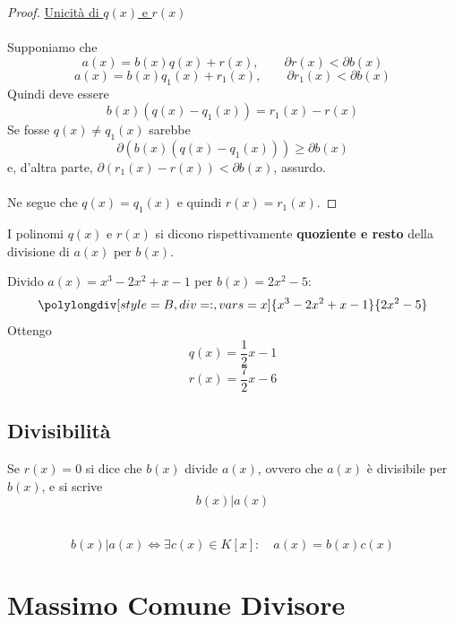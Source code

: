 \documentclass[a4paper,12pt, oneside]{book}
\begin{document}
\begin{teorema}
\begin{proof}
		\underline{Unicità di $q(x)$ e $r(x)$}\\\\
		Supponiamo che
		$$a(x) = b(x)q(x) + r(x), \qquad \partial r(x) < \partial b(x)$$
		$$a(x) = b(x)q_1(x) + r_1(x), \qquad \partial r_1(x) < \partial b(x)$$
		Quindi deve essere
		$$b(x) ( q(x) - q_1(x) ) = r_1(x) - r(x)$$
		Se fosse $q(x) \not = q_1(x)$ sarebbe
		$$\partial ( b(x)  ( q(x) - q_1(x) )) \geq \partial b(x)$$
		e, d'altra parte, $\partial ( r_1(x) -r(x) ) < \partial b(x)$, assurdo.\\\\
		Ne segue che $q(x) = q_1(x)$ e quindi $r(x) = r_1(x)$.
	\end{proof}
\end{teorema}

\begin{definizione}
	I polinomi $q(x)$ e $r(x)$ si dicono rispettivamente \textbf{quoziente e resto} della divisione di $a(x)$ per $b(x)$.
\end{definizione}

\begin{shaded}
	\begin{esempio}
		Divido $a(x)=x^3-2x^2+x-1$ per $b(x)=2x^2-5$:
		$$\polylongdiv[style=B,div=:,vars=x]{x^3-2x^2+x-1}{2x^2-5}$$
		Ottengo $$q(x)=\frac{1}{2}x-1$$ $$r(x)=\frac{7}{2}x-6$$
	\end{esempio}


\end{shaded}

\subsection{Divisibilità}

\begin{definizione}[Divisibilità]
	Se $r(x) = 0$ si dice che $b(x)$ divide $a(x)$, ovvero che $a(x)$ è divisibile per $b(x)$, e si scrive $$b(x) | a(x)$$\\
	\begin{nota}
		$$b(x) | a(x) \iff \exists c(x) \in K[x]: \quad a(x)=b(x)c(x)$$
	\end{nota}
\end{definizione}

\section{Massimo Comune Divisore}
\end{document}
